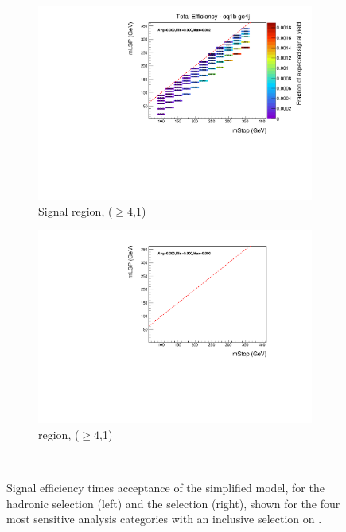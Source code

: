 \begin{figure}[p]
\begin{subfigure}[b]{0.47\textwidth}
    \includegraphics[width=\textwidth]{Figs/sms/t2cc/v37/effs/T2cc_had_eff_maps_eq1b_ge4j_SITV.pdf}
    \caption{Signal region, ($\geq 4$,1)}
    \label{fig:t2cc_sig_eff_ge4j_1b}
  \end{subfigure}
  \begin{subfigure}[b]{0.47\textwidth}
    \includegraphics[width=\textwidth]{Figs/sms/t2cc/v37/effs/T2cc_muon_eff_maps_eq1b_ge4j_SITV.pdf}
    \caption{\mj region, ($\geq 4$,1)}
    \label{fig:t2cc_mu_eff_ge4j_1b}
  \end{subfigure} \\
  \caption{Signal efficiency times acceptance of the \Ttwocc simplified model,
  for
  the hadronic selection (left) and the \mj selection (right), shown for the 
  four most sensitive analysis categories with an inclusive selection on \HT.}
  \label{fig:t2cc_eff}
\end{figure}

